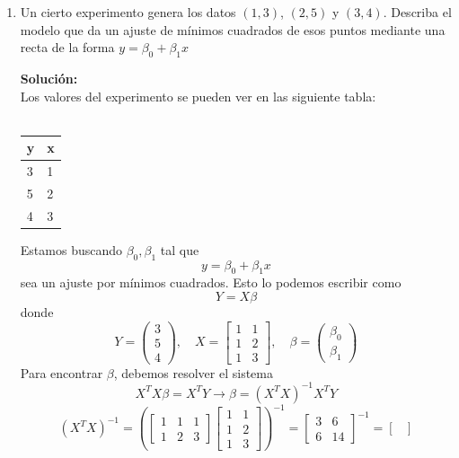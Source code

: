 \documentclass[12pt]{article}
\newenvironment{solucion}
{\begin{mdframed}[backgroundcolor=black!10]
		{\bf Solución:}\\
	}
	{
	\end{mdframed}
}
\newenvironment{preguntas}
{\begin{enumerate}\itemsep12pt
	}
	{
	\end{enumerate}
}
\newcommand{\ra}{\rightarrow}
\begin{document}
\begin{preguntas}
\item Un cierto experimento genera los datos $(1,3)$, $(2,5)$ y $(3,4)$. Describa el modelo que da un ajuste de mínimos cuadrados de esos puntos mediante una recta de la forma $y = \beta_0 +  \beta_1x$
\begin{solucion}
Los valores del experimento se pueden ver en las siguiente tabla:\\
		\\
		\begin{center}
		\begin{tabular}{|l|l|}
			\hline
			\textbf{y} & \textbf{x} \\ \hline
			3          & 1          \\ \hline
			5          & 2          \\ \hline
			4          & 3          \\ \hline
		\end{tabular}
		\end{center}
		Estamos buscando $\beta_0, \beta_1$ tal que
		$$y = \beta_0 +  \beta_1x$$
		sea un ajuste por mínimos cuadrados. Esto lo podemos escribir como
		$$Y = X\beta$$
		donde
		$$Y = \begin{pmatrix}
		3 \\ 5 \\ 4
		\end{pmatrix}, \quad 
		X = \begin{bmatrix}
		1 & 1 \\
		1 & 2 \\
		1 & 3
		\end{bmatrix}, \quad
		\beta = \begin{pmatrix}
		\beta_0 \\ \beta_1
		\end{pmatrix}$$
		Para encontrar $\beta$, debemos resolver el sistema
		$$X^TX\beta = X^TY \ra \beta = (X^TX)^{-1}X^TY$$
		$$(X^TX)^{-1} = \left(\begin{bmatrix}
		1 & 1 & 1\\
		1 & 2 & 3
		\end{bmatrix}
		\begin{bmatrix}
		1 & 1 \\
		1 & 2 \\
		1 & 3
		\end{bmatrix}\right)^{-1}
		 = 
		 \begin{bmatrix}
		 3 & 6 \\
		 6 & 14
		 \end{bmatrix}^{-1} = \begin{bmatrix}

\end{bmatrix}$$
\end{solucion}
\end{preguntas}
\end{document}
